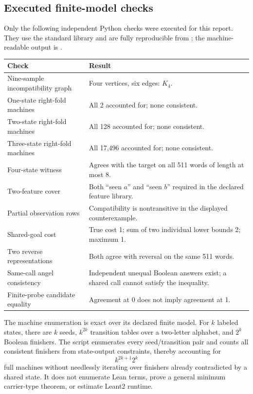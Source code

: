 \documentclass[11pt,a4paper]{article}
\theoremstyle{definition}
\theoremstyle{remark}
\begin{document}
\subsection{Executed finite-model checks}

Only the following independent Python checks were executed for this report. They use the standard library and are fully reproducible from ; the machine-readable output is .

\begin{center}
\begin{tabularx}{\textwidth}{@{}P{70mm}Y@{}}
\toprule
Check & Result\\\midrule
Nine-sample incompatibility graph & Four vertices, six edges: $K_4$.\\
One-state right-fold machines & All 2 accounted for; none consistent.\\
Two-state right-fold machines & All 128 accounted for; none consistent.\\
Three-state right-fold machines & All 17,496 accounted for; none consistent.\\
Four-state witness & Agrees with the target on all 511 words of length at most 8.\\
Two-feature cover & Both ``seen $a$'' and ``seen $b$'' required in the declared feature library.\\
Partial observation rows & Compatibility is nontransitive in the displayed counterexample.\\
Shared-goal cost & True cost 1; sum of two individual lower bounds 2; maximum 1.\\
Two reverse representations & Both agree with reversal on the same 511 words.\\
Same-call angel consistency & Independent unequal Boolean answers exist; a shared call cannot satisfy the inequality.\\
Finite-probe candidate equality & Agreement at 0 does not imply agreement at 1.\\
\bottomrule
\end{tabularx}
\end{center}

The machine enumeration is exact over its declared finite model. For $k$ labeled states, there are $k$ seeds, $k^{2k}$ transition tables over a two-letter alphabet, and $2^k$ Boolean finishers. The script enumerates every seed/transition pair and counts all consistent finishers from state-output constraints, thereby accounting for
\[
 k^{2k+1}2^k
\]
full machines without needlessly iterating over finishers already contradicted by a shared state. It does not enumerate Lean terms, prove a general minimum carrier-type theorem, or estimate Leant2 runtime.
\end{document}
